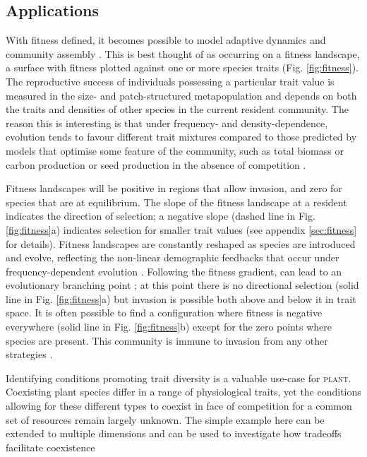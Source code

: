 \documentclass[a4paper,11pt]{article}
\newcommand{\plant}{\textsc{plant}}
\begin{document}
\subsection{Applications}

With fitness defined, it becomes possible to model adaptive dynamics
and community assembly \citep{Geritz-1998,Dieckmann-2007}. This is best
thought of as occurring on a fitness landscape, a surface with fitness
plotted against one or more species traits (Fig. \ref{fig:fitness}). The
reproductive success of individuals possessing a particular trait value
is measured in the size- and patch-structured metapopulation and
depends on both the traits and densities of other species in the current
resident community. The reason this is interesting is that under
frequency- and density-dependence, evolution tends to favour different
trait mixtures compared to those predicted by models that optimise some
feature of the community, such as total biomass or carbon production or
seed production in the absence of competition
\citep{Falster-2003, Dieckmann-2007}.

Fitness landscapes will be positive in regions that allow invasion,
and zero for species that are at equilibrium. The slope of the fitness
landscape at a resident indicates the direction of selection; a
negative slope (dashed line in Fig. \ref{fig:fitness}a) indicates
selection for smaller trait values (see appendix \ref{sec:fitness} for
details). Fitness landscapes are constantly reshaped as species are
introduced and evolve, reflecting the non-linear demographic feedbacks
that occur under frequency-dependent evolution
\citep{Geritz-1998,Dieckmann-2007}. Following the fitness gradient,
can lead to an evolutionary branching point
\citep{Geritz-1998,Dieckmann-2007}; at this point there is no
directional selection (solid line in Fig. \ref{fig:fitness}a) but
invasion is possible both above and below it in trait space. It is
often possible to find a configuration where fitness is negative
everywhere (solid line in Fig. \ref{fig:fitness}b) except for the zero
points where species are present. This community is immune to invasion
from any other strategies \citep{Geritz-1998}.

Identifying conditions promoting trait diversity is a valuable use-case
for {\plant}. Coexisting plant species differ in a range of physiological
traits, yet the conditions allowing for these different types to coexist
in face of competition for a common set of resources remain largely
unknown. The simple example here can be extended to multiple dimensions
and can be used to investigate how tradeoffs facilitate coexistence
\citep{Falster-2015}
\end{document}
